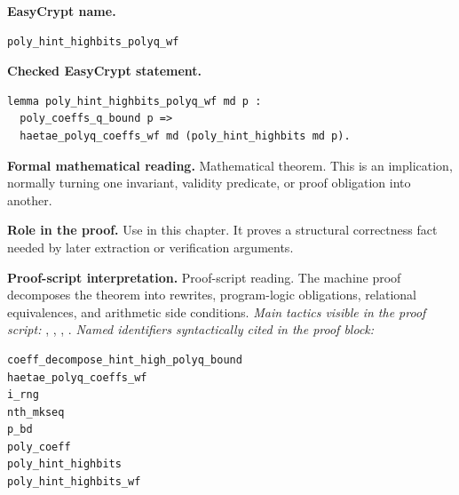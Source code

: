 \begin{formaltheorem}
\noindent\textbf{EasyCrypt name.}
\begin{lstlisting}[language=EasyCrypt,basicstyle=\ttfamily\scriptsize]
poly_hint_highbits_polyq_wf
\end{lstlisting}
\noindent\textbf{Checked EasyCrypt statement.}
\begin{lstlisting}[language=EasyCrypt,basicstyle=\ttfamily\scriptsize]
lemma poly_hint_highbits_polyq_wf md p :
  poly_coeffs_q_bound p =>
  haetae_polyq_coeffs_wf md (poly_hint_highbits md p).
\end{lstlisting}
\noindent\textbf{Formal mathematical reading.}
Mathematical theorem. This is an implication, normally turning one invariant, validity predicate, or proof obligation into another.

\noindent\textbf{Role in the proof.}
Use in this chapter. It proves a structural correctness fact needed by later extraction or verification arguments.

\noindent\textbf{Proof-script interpretation.}
Proof-script reading. The machine proof decomposes the theorem into rewrites, program-logic obligations, relational equivalences, and arithmetic side conditions.
\emph{Main tactics visible in the proof script:} , , , .
\emph{Named identifiers syntactically cited in the proof block:}
\begin{lstlisting}[language=EasyCrypt,basicstyle=\ttfamily\scriptsize]
coeff_decompose_hint_high_polyq_bound
haetae_polyq_coeffs_wf
i_rng
nth_mkseq
p_bd
poly_coeff
poly_hint_highbits
poly_hint_highbits_wf
\end{lstlisting}

\end{formaltheorem}

